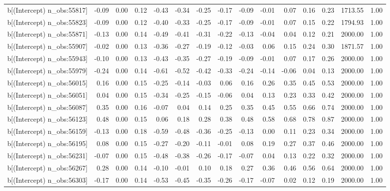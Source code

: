 \begin{table}[ht]
\begin{tabular}{rrrrrrrrrrrrrrr}
  b[(Intercept) n\_obs:55817] & -0.09 & 0.00 & 0.12 & -0.43 & -0.34 & -0.25 & -0.17 & -0.09 & -0.01 & 0.07 & 0.16 & 0.23 & 1713.55 & 1.00 \\ 
  b[(Intercept) n\_obs:55823] & -0.09 & 0.00 & 0.12 & -0.40 & -0.33 & -0.25 & -0.17 & -0.09 & -0.01 & 0.07 & 0.15 & 0.22 & 1794.93 & 1.00 \\ 
  b[(Intercept) n\_obs:55871] & -0.13 & 0.00 & 0.14 & -0.49 & -0.41 & -0.31 & -0.22 & -0.13 & -0.04 & 0.04 & 0.12 & 0.21 & 2000.00 & 1.00 \\ 
  b[(Intercept) n\_obs:55907] & -0.02 & 0.00 & 0.13 & -0.36 & -0.27 & -0.19 & -0.12 & -0.03 & 0.06 & 0.15 & 0.24 & 0.30 & 1871.57 & 1.00 \\ 
  b[(Intercept) n\_obs:55943] & -0.10 & 0.00 & 0.13 & -0.43 & -0.35 & -0.27 & -0.19 & -0.09 & -0.01 & 0.07 & 0.17 & 0.26 & 2000.00 & 1.00 \\ 
  b[(Intercept) n\_obs:55979] & -0.24 & 0.00 & 0.14 & -0.61 & -0.52 & -0.42 & -0.33 & -0.24 & -0.14 & -0.06 & 0.04 & 0.13 & 2000.00 & 1.00 \\ 
  b[(Intercept) n\_obs:56015] & 0.16 & 0.00 & 0.15 & -0.25 & -0.14 & -0.03 & 0.06 & 0.16 & 0.26 & 0.35 & 0.45 & 0.53 & 2000.00 & 1.00 \\ 
  b[(Intercept) n\_obs:56051] & 0.04 & 0.00 & 0.15 & -0.34 & -0.25 & -0.15 & -0.06 & 0.04 & 0.13 & 0.23 & 0.33 & 0.42 & 2000.00 & 1.00 \\ 
  b[(Intercept) n\_obs:56087] & 0.35 & 0.00 & 0.16 & -0.07 & 0.04 & 0.14 & 0.25 & 0.35 & 0.45 & 0.55 & 0.66 & 0.74 & 2000.00 & 1.00 \\ 
  b[(Intercept) n\_obs:56123] & 0.48 & 0.00 & 0.15 & 0.06 & 0.18 & 0.28 & 0.38 & 0.48 & 0.58 & 0.68 & 0.78 & 0.87 & 2000.00 & 1.00 \\ 
  b[(Intercept) n\_obs:56159] & -0.13 & 0.00 & 0.18 & -0.59 & -0.48 & -0.36 & -0.25 & -0.13 & 0.00 & 0.11 & 0.23 & 0.34 & 2000.00 & 1.00 \\ 
  b[(Intercept) n\_obs:56195] & 0.08 & 0.00 & 0.15 & -0.27 & -0.20 & -0.11 & -0.01 & 0.08 & 0.19 & 0.27 & 0.37 & 0.46 & 2000.00 & 1.00 \\ 
  b[(Intercept) n\_obs:56231] & -0.07 & 0.00 & 0.15 & -0.48 & -0.38 & -0.26 & -0.17 & -0.07 & 0.04 & 0.13 & 0.22 & 0.32 & 2000.00 & 1.00 \\ 
  b[(Intercept) n\_obs:56267] & 0.28 & 0.00 & 0.14 & -0.10 & -0.01 & 0.10 & 0.18 & 0.27 & 0.36 & 0.46 & 0.56 & 0.64 & 2000.00 & 1.00 \\ 
  b[(Intercept) n\_obs:56303] & -0.17 & 0.00 & 0.14 & -0.53 & -0.45 & -0.35 & -0.26 & -0.17 & -0.07 & 0.02 & 0.12 & 0.19 & 2000.00 & 1.00 \\ 

\end{tabular}
\end{table}
